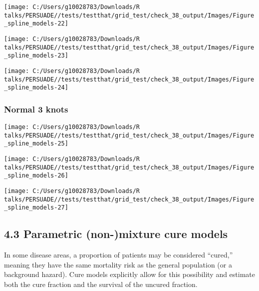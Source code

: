 \documentclass[
]{article}
\begin{document}
\begin{flushleft}\texttt{[image: C:/Users/g10028783/Downloads/R talks/PERSUADE//tests/testthat/grid\_test/check\_38\_output/Images/Figure\_spline\_models-22]} \end{flushleft}

\begin{flushleft}\texttt{[image: C:/Users/g10028783/Downloads/R talks/PERSUADE//tests/testthat/grid\_test/check\_38\_output/Images/Figure\_spline\_models-23]} \end{flushleft}

\begin{flushleft}\texttt{[image: C:/Users/g10028783/Downloads/R talks/PERSUADE//tests/testthat/grid\_test/check\_38\_output/Images/Figure\_spline\_models-24]} \end{flushleft}

\clearpage

\subsubsection{Normal 3 knots}\label{normal-3-knots}

\begin{flushleft}\texttt{[image: C:/Users/g10028783/Downloads/R talks/PERSUADE//tests/testthat/grid\_test/check\_38\_output/Images/Figure\_spline\_models-25]} \end{flushleft}

\begin{flushleft}\texttt{[image: C:/Users/g10028783/Downloads/R talks/PERSUADE//tests/testthat/grid\_test/check\_38\_output/Images/Figure\_spline\_models-26]} \end{flushleft}

\begin{flushleft}\texttt{[image: C:/Users/g10028783/Downloads/R talks/PERSUADE//tests/testthat/grid\_test/check\_38\_output/Images/Figure\_spline\_models-27]} \end{flushleft}

\clearpage

\subsection{4.3 Parametric (non-)mixture cure
models}\label{parametric-non-mixture-cure-models}

In some disease areas, a proportion of patients may be considered
``cured,'' meaning they have the same mortality risk as the general
population (or a background hazard). Cure models explicitly allow for
this possibility and estimate both the cure fraction and the survival of
the uncured fraction.
\end{document}
